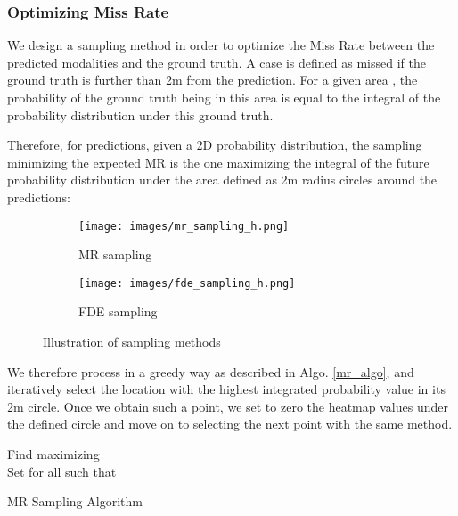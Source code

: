 \documentclass[letterpaper, 10 pt, conference]{ieeeconf}
\begin{document}
\subsubsection{Optimizing Miss Rate}

We design a sampling method in order to optimize the Miss Rate between the predicted modalities and the ground truth. A case is defined as missed if the ground truth is further than 2m from the prediction. For a given area , the probability of the ground truth  being in this area is equal to the integral of the probability distribution  under this ground truth. 






Therefore, for  predictions, given a 2D probability distribution, the sampling minimizing the expected MR is the one maximizing the integral of the future probability distribution under the area defined as 2m radius circles around the  predictions:




\begin{figure}[t]
    \center
    \begin{subfigure}[b]{0.23\textwidth}
        \texttt{[image: images/mr\_sampling\_h.png]}
        \caption{MR sampling}
        \label{fig:mr_samplimg}
    \end{subfigure}
    \begin{subfigure}[b]{0.23\textwidth}
        \texttt{[image: images/fde\_sampling\_h.png]}
        \caption{FDE sampling}
        \label{fig:fde_sampling}
    \end{subfigure}
    \caption{Illustration of sampling methods}
    \label{fig:sampling}
\end{figure}

We therefore process in a greedy way as described in Algo. \ref{mr_algo}, and iteratively select the location with the highest integrated probability value in its 2m circle. Once we obtain such a point, we set to zero the heatmap values under the defined circle and move on to selecting the next point with the same method. 

\begin{algorithm}
\DontPrintSemicolon 
{}
 {
    Find  maximizing  \\
    Set  for all  such that  \\
}
\caption{ MR Sampling Algorithm\label{IR}}
\label{mr_algo}
\end{algorithm}
\end{document}

